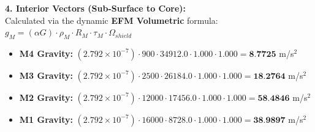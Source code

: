 \documentclass[11pt, a4paper]{article}
\begin{document}
  \vspace{0.5em}
  \noindent \textbf{4. Interior Vectors (Sub-Surface to Core):} \\[0.5em]
  \hspace*{1em} Calculated via the dynamic \textbf{EFM Volumetric} formula: $g_M = (\alpha G) \cdot \rho_{M} \cdot R_M \cdot \tau_M \cdot \Omega_{shield}$
  \begin{itemize}
    \item \textbf{M4 Gravity:} $(2.792 \times 10^{-7}) \cdot 900 \cdot 34912.0 \cdot 1.000 \cdot 1.000 = \textbf{8.7725}$ m/s$^2$
    \item \textbf{M3 Gravity:} $(2.792 \times 10^{-7}) \cdot 2500 \cdot 26184.0 \cdot 1.000 \cdot 1.000 = \textbf{18.2764}$ m/s$^2$
    \item \textbf{M2 Gravity:} $(2.792 \times 10^{-7}) \cdot 12000 \cdot 17456.0 \cdot 1.000 \cdot 1.000 = \textbf{58.4846}$ m/s$^2$
    \item \textbf{M1 Gravity:} $(2.792 \times 10^{-7}) \cdot 16000 \cdot 8728.0 \cdot 1.000 \cdot 1.000 = \textbf{38.9897}$ m/s$^2$
  \end{itemize}
\end{document}

